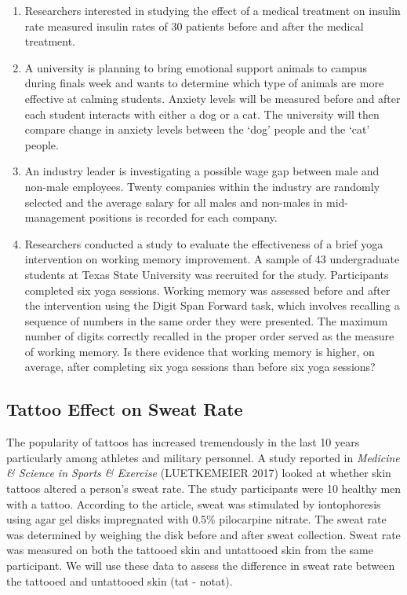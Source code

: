 \documentclass[
]{report}
\begin{document}
\begin{enumerate}
\def\labelenumi{\arabic{enumi}.}
\item
  Researchers interested in studying the effect of a medical treatment on insulin rate measured insulin rates of 30 patients before and after the medical treatment.
  \vspace{0.3in}
\item
  A university is planning to bring emotional support animals to campus during finals week and wants to determine which type of animals are more effective at calming students. Anxiety levels will be measured before and after each student interacts with either a dog or a cat. The university will then compare change in anxiety levels between the `dog' people and the `cat' people.
  \vspace{0.3in}
\item
  An industry leader is investigating a possible wage gap between male and non-male employees. Twenty companies within the industry are randomly selected and the average salary for all males and non-males in mid-management positions is recorded for each company.
  \vspace{0.3in}
\item
  Researchers conducted a study to evaluate the effectiveness of a brief yoga intervention on working memory improvement. A sample of 43 undergraduate students at Texas State University was recruited for the study. Participants completed six yoga sessions. Working memory was assessed before and after the intervention using the Digit Span Forward task, which involves recalling a sequence of numbers in the same order they were presented. The maximum number of digits correctly recalled in the proper order served as the measure of working memory. Is there evidence that working memory is higher, on average, after completing six yoga sessions than before six yoga sessions?\\
  \vspace{0.3in}
\end{enumerate}

\subsection{Tattoo Effect on Sweat Rate}\label{tattoo-effect-on-sweat-rate}

The popularity of tattoos has increased tremendously in the last 10 years particularly among athletes and military personnel. A study reported in \emph{Medicine \& Science in Sports \& Exercise} (LUETKEMEIER 2017) looked at whether skin tattoos altered a person's sweat rate. The study participants were 10 healthy men with a tattoo. According to the article, sweat was stimulated by iontophoresis using agar gel disks impregnated with 0.5\% pilocarpine nitrate. The sweat rate was determined by weighing the disk before and after sweat collection. Sweat rate was measured on both the tattooed skin and untattooed skin from the same participant. We will use these data to assess the difference in sweat rate between the tattooed and untattooed skin (tat - notat).
\end{document}
